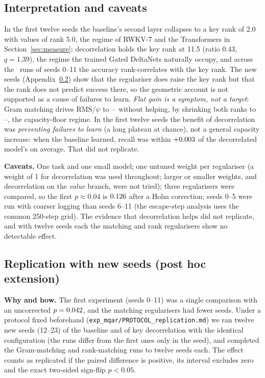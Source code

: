 \subsection{Interpretation and caveats}
In the first twelve seeds the baseline's second layer collapses to a key rank of 2.0 with values of rank 5.0, the regime of RWKV-7 and the Transformers in Section~\ref{sec:measure}; decorrelation holds the key rank at 11.5 (ratio 0.43, $q=1.39$), the regime the trained Gated DeltaNets naturally occupy, and across the \mqNRuns\ runs of seeds 0--11 the accuracy rank-correlates with the key rank. The new seeds (Appendix~\ref{app:leverrep}) show that the regulariser does raise the key rank but that the rank does not predict success there, so the geometric account is not supported as a cause of failures to learn. \emph{Flat gain is a symptom, not a target}: Gram matching drives $\mathrm{RMS}/\psi$ to \gramRmsLo--\gramRmsHi\ without helping, by shrinking both ranks to \gramRankLo--\gramRankHi, the capacity-floor regime. In the first twelve seeds the benefit of decorrelation was \emph{preventing failures to learn} (a long plateau at chance), not a general capacity increase: when the baseline learned, recall was within $+0.003$ of the decorrelated model's on average. That did not replicate.

\textbf{Caveats.} One task and one small model; one untuned weight per regulariser (a weight of 1 for decorrelation was used throughout; larger or smaller weights, and decorrelation on the \emph{value} branch, were not tried); three regularisers were compared, so the first $p\approx0.04$ is $0.126$ after a Holm correction; seeds 0--5 were run with coarser logging than seeds 6--11 (the escape-step analysis uses the common 250-step grid). The evidence that decorrelation helps did not replicate, and with twelve seeds each the matching and rank regularisers show no detectable effect.

\subsection{Replication with new seeds (post hoc extension)}\label{app:leverrep}
\textbf{Why and how.} The first experiment (seeds 0--11) was a single comparison with an uncorrected $p=0.042$, and the matching regularisers had fewer seeds. Under a protocol fixed beforehand (\texttt{exp\_mqar/\allowbreak PROTOCOL\_replication.md}) we ran twelve new seeds (12--23) of the baseline and of key decorrelation with the identical configuration (the runs differ from the first ones only in the seed), and completed the Gram-matching and rank-matching runs to twelve seeds each. The effect counts as replicated if the paired difference is positive, its interval excludes zero and the exact two-sided sign-flip $p<0.05$.

